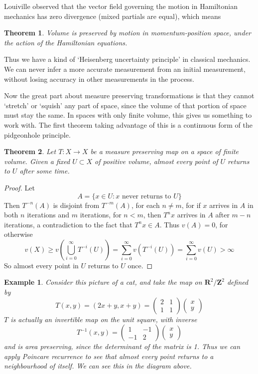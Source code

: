 \documentclass[12pt]{report}
\theoremstyle{plain}
\newtheorem{theorem}{Theorem}
\newtheorem*{example}{Example}
\theoremstyle{definition}
\begin{document}
Louiville observed that the vector field governing the motion in Hamiltonian mechanics has zero divergence (mixed partials are equal), which means

\begin{theorem}
    Volume is preserved by motion in momentum-position space, under the action of the Hamiltonian equations.
\end{theorem}

Thus we have a kind of `Heisenberg uncertainty principle' in classical mechanics. We can never infer a more accurate measurement from an initial measurement, without losing accuracy in other measurements in the process.

Now the great part about measure preserving transformations is that they cannot `stretch' or `squish' any part of space, since the volume of that portion of space must stay the same. In spaces with only finite volume, this gives us something to work with. The first theorem taking advantage of this is a continuous form of the pidgeonhole principle.

\begin{theorem}
    Let $T: X \to X$ be a measure preserving map on a space of finite volume. Given a fixed $U \subset X$ of positive volume, almost every point of $U$ returns to $U$ after some time.
\end{theorem}
\begin{proof}
    Let
    \[ A = \{ x \in U : \text{$x$ never returns to $U$} \} \]
    Then $T^{-n}(A)$ is disjoint from $T^{-m}(A)$, for each $n \neq m$, for if $x$ arrives in $A$ in both $n$ iterations and $m$ iterations, for $n < m$, then $T^n x$ arrives in $A$ after $m - n$ iterations, a contradiction to the fact that $T^n x \in A$. Thus $v(A) = 0$, for otherwise
    \[ v(X) \geq v\left( \bigcup_{i = 0}^\infty T^{-i}(U) \right) = \sum_{i = 0}^\infty v(T^{-i}(U)) = \sum_{i = 0}^\infty v(U) > \infty \]
    So almost every point in $U$ returns to $U$ once.
\end{proof}

\begin{example}
    Consider this picture of a cat, and take the map on $\mathbf{R}^2 / \mathbf{Z}^2$ defined by
    \[ T(x,y) = (2x + y, x + y) = \begin{pmatrix} 2 & 1 \\ 1 & 1 \end{pmatrix} \begin{pmatrix} x \\ y \end{pmatrix} \]
    $T$ is actually an invertible map on the unit square, with inverse
    \[ T^{-1}(x,y) = \begin{pmatrix} 1 & -1 \\ -1 & 2 \end{pmatrix} \begin{pmatrix} x \\ y \end{pmatrix} \]
    and is area preserving, since the determinant of the matrix is 1. Thus we can apply Poincare recurrence to see that almost every point returns to a neighbourhood of itself. We can see this in the diagram above.
\end{example}
\end{document}
